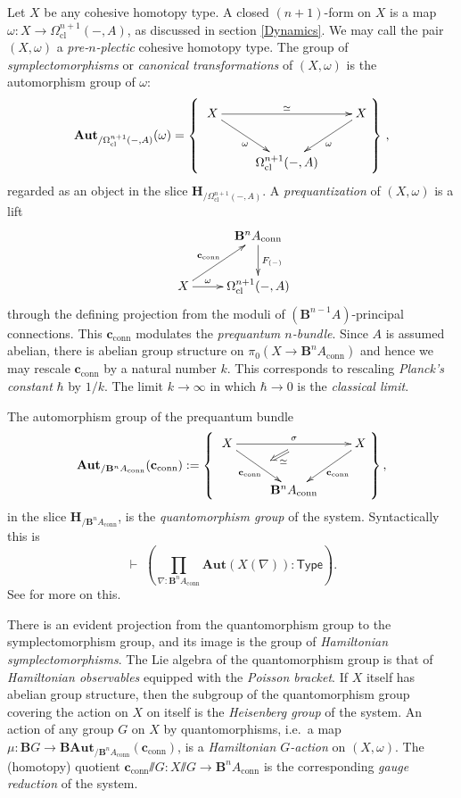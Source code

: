 \documentclass[copyright,12pt]{eptcs}
\newcommand{\type}{\ensuremath{\mathsf{Type}}\xspace}
\newcommand{\ssl}{\mathord{\sslash}}
\begin{document}
Let $X$ be any cohesive homotopy type. A closed $(n+1)$-form on $X$ is a map
$\omega : X \to \Omega^{n+1}_{\mathrm{cl}}(-,A)$, as discussed in section \ref{Dynamics}.
We may call the pair $(X, \omega)$ a \emph{pre-$n$-plectic} cohesive homotopy type.
The group of \emph{symplectomorphisms} or \emph{canonical transformations} of $(X, \omega)$
is the automorphism group of $\omega$:
\[
    \mathbf{Aut}_{/\Omega^{n+1}_{\mathrm{\mathrm{cl}}}(-, A)}(\omega)
  =
  \left\{
    \raisebox{20pt}{
    \xymatrix{
       X \ar[rr]^{\simeq} \ar[dr]_{\omega} && X \ar[dl]^{\omega}
     \\
     & \Omega^{n+1}_{\mathrm{cl}}(-,A)
    }
    }
  \right\}
  \,,
\]
regarded as an object in the slice
$\mathbf{H}_{/\Omega^{n+1}_{\mathrm{cl}}(-,A)}$.
A \emph{prequantization} of $(X,\omega)$ is a lift
\[ %
 \raisebox{18pt}{
  \xymatrix{
      & \mathbf{B}^n A_{\mathrm{conn}}
    \ar[d]^{F_{(-)}}
     \\
     X \ar[ur]^-{\mathbf{c}_{\mathrm{conn}}} \ar[r]^-\omega & \Omega^{n+1}_{\mathrm{cl}}(-,A)
  }
  }
\]
through
the defining projection from the moduli of $(\mathbf{B}^{n-1}A)$-principal connections.
This $\mathbf{c}_{\mathrm{conn}}$ modulates the \emph{prequantum $n$-bundle}.
Since $A$ is assumed abelian, there is abelian
group structure on $\pi_0(X \to \mathbf{B}^n A_{\mathrm{conn}})$ and hence we may rescale
$\mathbf{c}_{\mathrm{conn}}$ by a natural number $k$.
This corresponds to rescaling \emph{Planck's constant} $\hbar$ by $1/k$. The limit $k \to \infty$
in which $\hbar \to 0$ is the \emph{classical limit}.


The automorphism group of the prequantum bundle
\[
   \mathbf{Aut}_{/\mathbf{B}^n A_{\mathrm{conn}}}(\mathbf{c}_{\mathrm{conn}})
  :=
  \left\{
    \raisebox{20pt}{
    \xymatrix{
      X \ar[rr]^{\sigma}_{\ }="s" \ar[dr]_{\mathbf{c}_{\mathrm{conn}}}^{\ }="t" & & X \ar[dl]^{\mathbf{c}_{\mathrm{conn}}}
    \\
    & \mathbf{B}^n A_{\mathrm{conn}}
    \ar@{=>}^\simeq "s"; "t"
    }
    }
  \right\},
\]
in the slice $\mathbf{H}_{/\mathbf{B}^n A_{\mathrm{conn}}}$,
is the \emph{quantomorphism group} of the system.
Syntactically this is
$$
  \vdash\; \left(\prod_{\nabla : \mathbf{B}^n A_{\mathrm{conn}}}
    \mathbf{Aut}(X(\nabla))
  :
  \type
  \right).
$$
See \cite{SchreiberErlangen} for more on this.

There is an evident projection from the
quantomorphism group to the symplectomorphism group, and its image is the group of
\emph{Hamiltonian symplectomorphisms}.
The Lie algebra of the quantomorphism group is that of
\emph{Hamiltonian observables} equipped with the \emph{Poisson bracket}.
If $X$ itself has abelian group structure,
then the subgroup of the quantomorphism group covering the action on $X$ on itself is the
\emph{Heisenberg group} of the system.
An action of any group $G$ on $X$ by quantomorphisms, i.e.\ a map
$\mu : \mathbf{B}G \to \mathbf{B}\mathbf{Aut}_{/\mathbf{B}^n A_{\mathrm{conn}}}(\mathbf{c}_{\mathrm{conn}})$,
is a \emph{Hamiltonian $G$-action} on $(X,\omega)$. The (homotopy) quotient
$\mathbf{c}_{\mathrm{conn}}\ssl G : X \ssl G \to \mathbf{B}^n A_{\mathrm{conn}}$ is the
corresponding \emph{gauge reduction} of the system.
\end{document}
